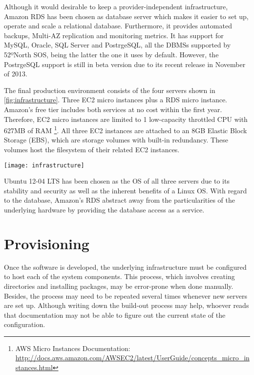 Although it would desirable to keep a provider-independent infrastructure, Amazon RDS has been chosen as database server which makes it easier to set up, operate and scale a relational database. Furthermore, it provides automated backups, Multi-AZ replication and monitoring metrics. It has support for MySQL, Oracle, SQL Server and PostrgeSQL, all the DBMSs supported by 52ºNorth SOS, being the latter the one it uses by default. However, the PostrgeSQL support is still in beta version due to its recent release in November of 2013.

The final production environment consists of the four servers shown in \ref{fig:infrastructure}. Three EC2 micro instances plus a RDS micro instance. Amazon's free tier includes both services at no cost within the first year. Therefore, EC2 micro instances are limited to 1 low-capacity throttled CPU with 627MB of RAM \footnote{AWS Micro Instances Documentation: \url{http://docs.aws.amazon.com/AWSEC2/latest/UserGuide/concepts_micro_instances.html}}. All three EC2 instances are attached to an 8GB Elastic Block Storage (EBS), which are storage volumes with built-in redundancy. These volumes host the filesystem of their related EC2 instances.

\begin{sidewaysfigure}
  \centering
  \texttt{[image: infrastructure]}
  \caption{Production's infrastructure diagram}
  \label{fig:infrastructure}
\end{sidewaysfigure}

Ubuntu 12-04 LTS has been chosen as the OS of all three servers due to its stability and security as well as the inherent benefits of a Linux OS. With regard to the database, Amazon's RDS abstract away from the particularities of the underlying hardware by providing the database access as a service.

\section{Provisioning}

Once the software is developed, the underlying infrastructure must be configured to host each of the system components. This process, which involves creating directories and installing packages, may be error-prone when done manually. Besides, the process may need to be repeated several times whenever new servers are set up. Although writing down the build-out process may help, whoever reads that documentation may not be able to figure out the current state of the configuration.


